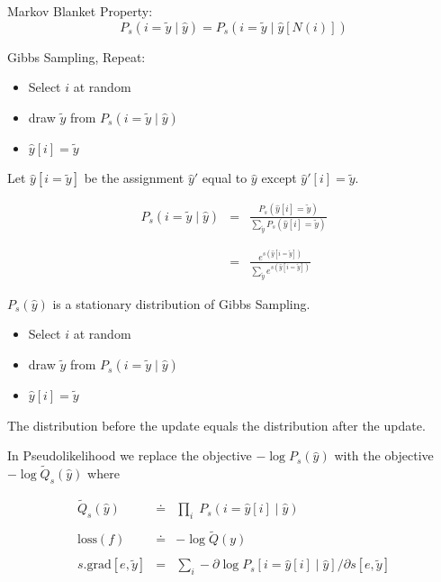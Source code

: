 {\vfill
Markov Blanket Property:
$$P_s(i=\tilde{y} \;|\;\hat{y}) = P_s(i=\tilde{y} \;|\;\hat{y}[N(i)])$$
  
\vfill
Gibbs Sampling, Repeat:

\begin{itemize}
\item   Select $i$ at random

\item draw $\tilde{y}$ from $P_s(i = \tilde{y} \;|\;\hat{y})$

\item $\hat{y}[i] = \tilde{y}$
\end{itemize}


Let $\hat{y}[i = \tilde{y}]$ be the assignment $\hat{y}'$ equal to $\hat{y}$ except $\hat{y}'[i] = \tilde{y}$.

\vfill
\begin{eqnarray*}
 P_s(i = \tilde{y} \;|\; \hat{y})  & = & \frac{P_s(\hat{y}[i] = \tilde{y})}{\sum_{\tilde{y}} P_s(\hat{y}[i] = \tilde{y})} \\
  \\
  \\
  & = & \frac{e^{s(\hat{y}[i = \tilde{y}])}}{\sum_{\tilde{y}} e^{s(\hat{y}[i = \tilde{y}])}}
\end{eqnarray*}


$P_s(\hat{y})$ is a stationary distribution of Gibbs Sampling.

\vfill
\begin{itemize}
\item   Select $i$ at random

\item draw $\tilde{y}$ from $P_s(i = \tilde{y} \;|\;\hat{y})$

\item $\hat{y}[i] = \tilde{y}$
\end{itemize}


\vfill
The distribution before the update equals the distribution after the update.


In Pseudolikelihood we replace the objective $- \log P_s(\hat{y})$ with the objective $- \log \tilde{Q}_s(\hat{y})$ where

\vfill
\begin{eqnarray*}
  \tilde{Q}_s(\hat{y}) & \doteq & \prod_i \;P_s(i = \hat{y}[i] \;|\;\hat{y}) \\
  \\
  \mathrm{loss}(f) & \doteq & - \log \tilde{Q}(y) \\
  \\
  s.\mathrm{grad}[e,\tilde{y}] & = & \sum_i - \partial \log P_s[i = \hat{y}[i] \;|\;\hat{y}] /\partial s[e,\tilde{y}]
\end{eqnarray*}


}
